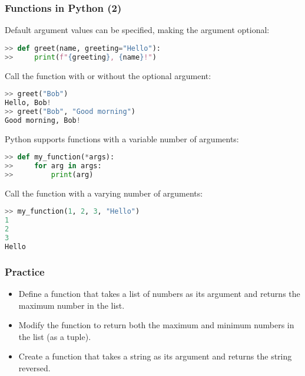 \begin{frame}[fragile]
  \frametitle{Functions in Python (2)}
  Default argument values can be specified, making the argument optional:
  \begin{lstlisting}[language=Python]
>> def greet(name, greeting="Hello"):
>>     print(f"{greeting}, {name}!")
  \end{lstlisting}\pause
  Call the function with or without the optional argument:
  \begin{lstlisting}[language=Python]
>> greet("Bob")
Hello, Bob!
>> greet("Bob", "Good morning")
Good morning, Bob!
  \end{lstlisting}\pause
  Python supports functions with a variable number of arguments:
  \begin{lstlisting}[language=Python]
>> def my_function(*args):
>>     for arg in args:
>>         print(arg)
  \end{lstlisting}\pause
  Call the function with a varying number of arguments:
  \begin{lstlisting}[language=Python]
>> my_function(1, 2, 3, "Hello")
1
2
3
Hello
  \end{lstlisting}
\end{frame}

\begin{frame}[fragile]
 \frametitle{Practice}
 \begin{itemize}
  \item Define a function that takes a list of numbers as its argument and returns the maximum number in the list.\pause
  \item Modify the function to return both the maximum and minimum numbers in the list (as a tuple).\pause
  \item Create a function that takes a string as its argument and returns the string reversed.
 \end{itemize}
\end{frame}

